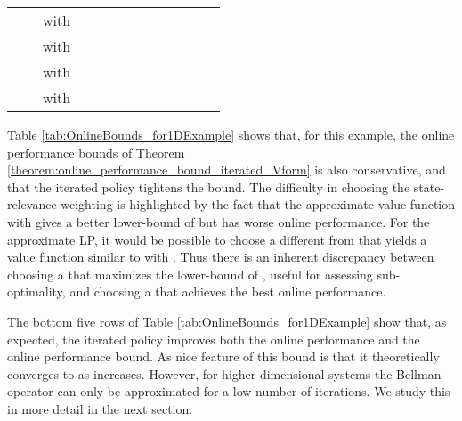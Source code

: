\documentclass[journal]{IEEEtran}
\begin{document}
\begin{table*}[t]
\begin{tabular}{|cc|l|cccc|cccc|cc|}
		\\
		\hline\hline
		\multirow{4}{0.0cm}{\rotatebox{90}{Lower}} &
		\multirow{4}{0.1cm}{\rotatebox{90}{Bound}} &
		 with  &
		  &    &    &    &
		  &    &    &    &       &     
		\\
&&  with  &
		  &    &    &    &
		  &    &    &    &       &     
		\\
&&  with  &
		  &    &    &    &
		  &    &    &    &       &     
		\\
&&  with  &
		  &    &    &    &
		  &    &    &    &       &     
		\\
		\hline
	\end{tabular}
	
	\label{tab:numerical_results_NDexample}
\end{table*}












Table \ref{tab:OnlineBounds_for1DExample} shows that, for this example, the online performance bounds of Theorem \ref{theorem:online_performance_bound_iterated_Vform} is also conservative, and that the iterated policy tightens the bound.
The difficulty in choosing the state-relevance weighting is highlighted by the fact that the approximate value function with  gives a better lower-bound of  but has worse online performance.
For the  approximate LP, it would be possible to choose a  different from  that yields a value function similar to  with .
Thus there is an inherent discrepancy between choosing a  that maximizes the lower-bound of , useful for assessing sub-optimality, and choosing a  that achieves the best online performance. 


The bottom five rows of Table \ref{tab:OnlineBounds_for1DExample} show that, as expected, the iterated policy improves both the online performance and the online performance bound. As nice feature of this bound is that it theoretically converges to  as  increases. However, for higher dimensional systems the Bellman operator can only be approximated for a low number of iterations.
We study this in more detail in the next section.
\end{document}

